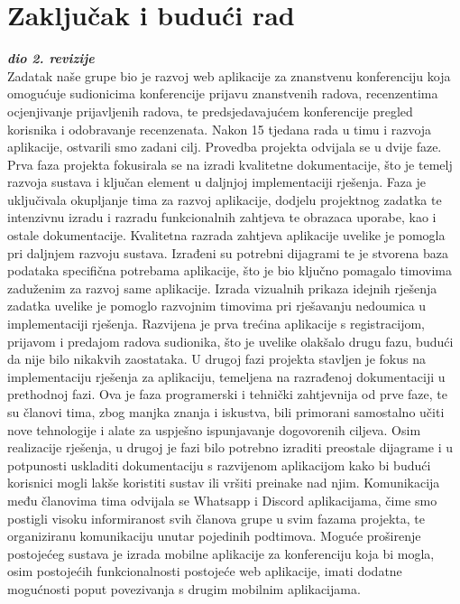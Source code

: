 \chapter{Zaključak i budući rad}
		
		\textbf{\textit{dio 2. revizije}}\\
		 
		 Zadatak naše grupe bio je razvoj web aplikacije za znanstvenu konferenciju koja omogućuje sudionicima konferencije prijavu znanstvenih radova, recenzentima ocjenjivanje prijavljenih radova, te predsjedavajućem konferencije pregled korisnika i odobravanje recenzenata. Nakon 15 tjedana rada u timu i razvoja aplikacije, ostvarili smo zadani cilj. Provedba projekta odvijala se u dvije faze.
		 \newline
		 \newline
		 \indent Prva faza projekta fokusirala se na izradi kvalitetne dokumentacije, što je temelj razvoja sustava i ključan element u daljnjoj implementaciji rješenja. Faza je uključivala okupljanje tima za razvoj aplikacije, dodjelu projektnog zadatka te intenzivnu izradu i razradu funkcionalnih zahtjeva te obrazaca uporabe, kao i ostale dokumentacije. Kvalitetna razrada zahtjeva aplikacije uvelike je pomogla pri daljnjem razvoju sustava. Izrađeni su potrebni dijagrami te je stvorena baza podataka specifična potrebama aplikacije, što je bio ključno pomagalo timovima zaduženim za razvoj same aplikacije. Izrada vizualnih prikaza idejnih rješenja zadatka uvelike je pomoglo razvojnim timovima pri rješavanju nedoumica u implementaciji rješenja. Razvijena je prva trećina aplikacije s registracijom, prijavom i predajom radova sudionika, što je uvelike olakšalo drugu fazu, budući da nije bilo nikakvih zaostataka.
		 \newline
		 \newline
		 \indent U drugoj fazi projekta stavljen je fokus na implementaciju rješenja za aplikaciju, temeljena na razrađenoj dokumentaciji u prethodnoj fazi. Ova je faza programerski i tehnički zahtjevnija od prve faze, te su članovi tima, zbog manjka znanja i iskustva, bili primorani samostalno učiti nove tehnologije i alate za uspješno ispunjavanje dogovorenih ciljeva. Osim realizacije rješenja, u drugoj je fazi bilo potrebno izraditi preostale dijagrame i u potpunosti uskladiti dokumentaciju s razvijenom aplikacijom kako bi budući korisnici mogli lakše koristiti sustav ili vršiti preinake nad njim. 
		 \newline
		 \newline
		 \indent Komunikacija među članovima tima odvijala se Whatsapp i Discord aplikacijama, čime smo postigli visoku informiranost svih članova grupe u svim fazama projekta, te organiziranu komunikaciju unutar pojedinih podtimova. Moguće proširenje postojećeg sustava je izrada mobilne aplikacije za konferenciju koja bi mogla, osim postojećih funkcionalnosti postojeće web aplikacije, imati dodatne mogućnosti poput povezivanja s drugim mobilnim aplikacijama. 
